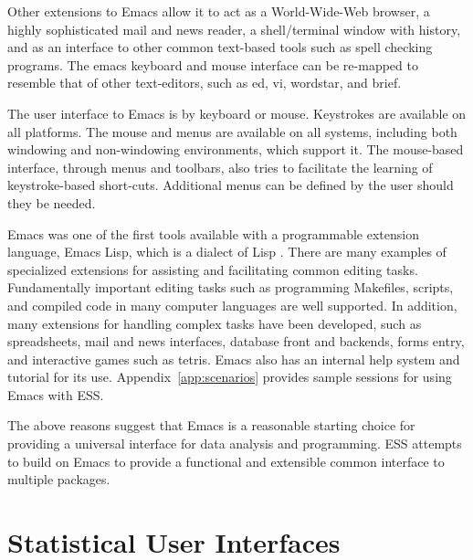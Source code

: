 \documentclass{article}
\begin{document}
Other extensions to Emacs allow it to act as a World-Wide-Web browser,
a highly sophisticated mail and news reader, a shell/terminal window
with history, and as an interface to other common text-based tools
such as spell checking programs.  The emacs keyboard and mouse
interface can be re-mapped to resemble that of other text-editors,
such as ed, vi, wordstar, and brief.

The user interface to Emacs is by keyboard or mouse.  Keystrokes are
available on all platforms.  The mouse and menus are available on all
systems, including both windowing and non-windowing environments,
which support it.  The mouse-based interface, through menus and
toolbars, also tries to facilitate the learning of keystroke-based
short-cuts.  Additional menus can be defined by the user should they
be needed.

Emacs was one of the first tools available with a programmable
extension language, Emacs Lisp, which is a dialect of Lisp
\citep{RChassell1999,PGraham:1996}.  There are many examples of
specialized extensions for assisting and facilitating common editing
tasks.  Fundamentally important editing tasks such as programming
Makefiles, scripts, and compiled code in many computer languages are
well supported.  In addition, many extensions for handling complex
tasks have been developed, such as spreadsheets, mail and news
interfaces, database front and backends, forms entry, and interactive
games such as tetris.  Emacs also has an internal help system and
tutorial for its use.  Appendix~\ref{app:scenarios} provides sample
sessions for using Emacs with ESS.

The above reasons suggest that Emacs is a reasonable starting choice
for providing a universal interface for data analysis and programming.
ESS attempts to build on Emacs to provide a functional and extensible
common interface to multiple packages.

\section{Statistical User Interfaces}
\label{sec:UI}
\end{document}
